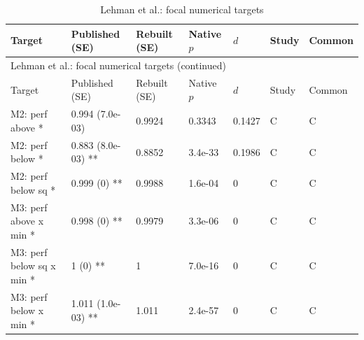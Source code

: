 {\scriptsize\setlength{\tabcolsep}{3pt}\renewcommand{\arraystretch}{1.06}
\begin{longtable}{@{}p{.245\linewidth}p{.17\linewidth}p{.17\linewidth}p{.085\linewidth}p{.060\linewidth}p{.08\linewidth}p{.07\linewidth}@{}}
\caption{Lehman et al.: focal numerical targets}\label{tab:focal:lehman2011}\\
\toprule Target & Published (SE) & Rebuilt (SE) & Native $p$ & $d$ & Study & Common\\\midrule
\endfirsthead\multicolumn{7}{l}{\small Lehman et al.: focal numerical targets (continued)}\\\toprule Target & Published (SE) & Rebuilt (SE) & Native $p$ & $d$ & Study & Common\\\midrule\endhead\bottomrule\endfoot
M2: perf above * & 0.994 (7.0e-03) & 0.9924 & 0.3343 & 0.1427 & C & C\\
M2: perf below * & 0.883 (8.0e-03) ** & 0.8852 & 3.4e-33 & 0.1986 & C & C\\
M2: perf below sq * & 0.999 (0) ** & 0.9988 & 1.6e-04 & 0 & C & C\\
M3: perf above x min * & 0.998 (0) ** & 0.9979 & 3.3e-06 & 0 & C & C\\
M3: perf below sq x min * & 1 (0) ** & 1 & 7.0e-16 & 0 & C & C\\
M3: perf below x min * & 1.011 (1.0e-03) ** & 1.011 & 2.4e-57 & 0 & C & C\\
\end{longtable}}
